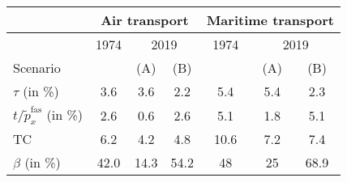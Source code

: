 \begin{tabular}{l|c|cc||c|cc}
\hline \hline
& \multicolumn{3}{|c||}{Air transport} & \multicolumn{3}{|c}{Maritime transport} \\ \hline
& 1974 & \multicolumn{2}{|c||}{2019} & 1974 & \multicolumn{2}{|c}{2019}\\
Scenario &  & (A) &  (B) &  & (A) & (B) \\ \hline

$\tau$ (in \%) & 3.6 & 3.6 & 2.2 & 5.4 & 5.4 & 2.3\\
$t/\widetilde{p}^{\text{fas}}_x$ (in \%) & 2.6 & 0.6 & 2.6 & 5.1 & 1.8 & 5.1 \\
TC & 6.2 & 4.2 & 4.8 & 10.6 & 7.2 & 7.4 \\
$\beta$ (in \%) & 42.0 & 14.3 & 54.2 & 48 & 25 & 68.9 \\
\hline \hline
\end{tabular} 